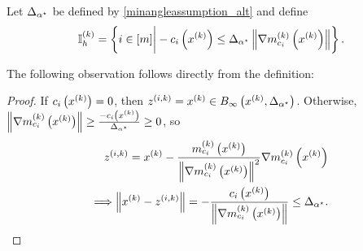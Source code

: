 Let ${\Delta_{\alpha^{\star}}}$ be defined by \cref{minangleassumption_alt} and define
\begin{align}
{ \mathbb I_h^{(k)} } = \left\{i \in [m] \bigg| -c_i\left(x^{(k)}\right) \le {\Delta_{\alpha^{\star}}} \left\|{\nabla m_{c_i}^{(k)}\left(x^{(k)}\right)}\right\| \right\}. \label{define_activeindicesk}
\end{align}



The following observation follows directly from the definition:
\begin{proof}
If $c_i\left(x^{(k)}\right) = 0$, then ${z^{(i, k)}} = x^{(k)} \in B_{\infty}\left(x^{(k)}, {\Delta_{\alpha^{\star}}} \right)$.
Otherwise, $\left\|{\nabla m_{c_i}^{(k)}\left(x^{(k)}\right)}\right\| \ge \frac{-c_i\left(x^{(k)}\right)}{{\Delta_{\alpha^{\star}}}} \ge 0$, so
\begin{align*}
{z^{(i, k)}} = x^{(k)} - \frac{m^{(k)}_{c_i}\left(x^{(k)}\right)}{\left\|{\nabla m_{c_i}^{(k)}\left(x^{(k)}\right)}\right\|^2} {\nabla m_{c_i}^{(k)}\left(x^{(k)}\right)} \\
\Longrightarrow \left\|x^{(k)} - {z^{(i, k)}} \right\|= -\frac{c_i\left(x^{(k)}\right)}{\left\|{\nabla m_{c_i}^{(k)}\left(x^{(k)}\right)}\right\|} \le {\Delta_{\alpha^{\star}}}.
\end{align*}
\end{proof}

